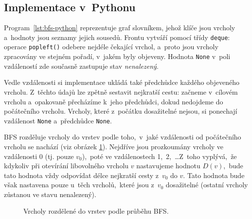 \subsection{Implementace v~Pythonu}

Program~\ref{lst:bfs-python} reprezentuje graf slovníkem, jehož klíče jsou vrcholy a~hodnoty jsou seznamy jejich sousedů. Frontu vytváří pomocí třídy \texttt{deque}: operace \texttt{popleft()} odebere nejdéle čekající vrchol, a~proto jsou vrcholy zpracovány ve stejném pořadí, v~jakém byly objeveny. Hodnota \texttt{None} v~poli vzdáleností zde současně zastupuje stav \emph{nenalezený}.

Vedle vzdálenosti si implementace ukládá také předchůdce každého objeveného vrcholu. Z~těchto údajů lze zpětně sestavit nejkratší cestu: začneme v~cílovém vrcholu a~opakovaně přecházíme k~jeho předchůdci, dokud nedojdeme do počátečního vrcholu. Vrcholy, které z~počátku dosažitelné nejsou, si ponechají vzdálenost \texttt{None} a~předchůdce \texttt{None}.



BFS rozděluje vrcholy do vrstev podle toho,~v~jaké vzdálenosti od počátečního vrcholu se nachází (viz obrázek \ref{fig:bfs_vrstvy}). Nejdříve jsou prozkoumány vrcholy ve vzdálenosti 0 (tj. pouze $v_0$),~poté ve vzdálenostech 1,~2,~\dots Z~toho vyplývá,~že kdykoliv při otevírání libovolného vrcholu $v$ nastavujeme hodnotu $D(v)$,~bude tato hodnota vždy odpovídat délce nejkratší cesty z~$v_0$ do $v$. Tato hodnota bude však nastavena pouze u~těch vrcholů,~které jsou z~$v_0$ dosažitelné (ostatní vrcholy zůstanou ve stavu nenalezený).
\begin{figure}[ht]
    \centering
    
    \caption{Vrcholy rozdělené do vrstev podle průběhu BFS.}
    \label{fig:bfs_vrstvy}
\end{figure}

